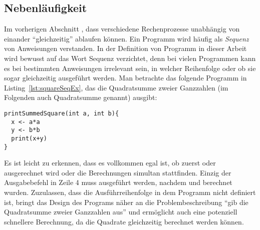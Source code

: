 \subsection{Nebenläufigkeit}\label{sec:nebenl}
Im vorherigen Abschnitt , dass verschiedene Rechenprozesse unabhängig von einander \enquote{gleichzeitig} ablaufen können. Ein Programm wird häufig als \emph{Sequenz} von Anweisungen verstanden. In der Definition von Programm in dieser Arbeit wird bewusst auf das Wort Sequenz verzichtet, denn bei vielen Programmen kann es bei bestimmten Anweisungen irrelevant sein, in welcher Reihenfolge oder ob sie sogar gleichzeitig ausgeführt werden. Man betrachte das folgende Programm in Listing~\ref{lst:squareSeqEx}, das die Quadratsumme zweier Ganzzahlen (im Folgenden auch Quadratsumme genannt) ausgibt: 
\begin{lstlisting}[caption={Beispiel eines Programms das die Summe von Quadraten zweier Ganzzahlen berechnet. Die Berechnung der Quadratzahlen wird nacheinander in einer fest definierten Sequenz durchgeführt.}, label={lst:squareSeqEx}]
printSummedSquare(int a, int b){
  x <- a*a
  y <- b*b
  print(x+y)
}
\end{lstlisting}
Es ist leicht zu erkennen, dass es vollkommen egal ist, ob zuerst  oder  ausgerechnet wird oder die Berechnungen simultan stattfinden. Einzig der Ausgabebefehl in Zeile 4 muss ausgeführt werden, nachdem  und  berechnet wurden. Zuzulassen, dass die Ausführreihenfolge in dem Programm nicht definiert ist, bringt das Design des Programs näher an die Problembeschreibung \enquote{gib die Quadratsumme zweier Ganzzahlen aus} und ermöglicht auch eine potenziell schnellere Berechnung, da die Quadrate gleichzeitig berechnet werden können.

